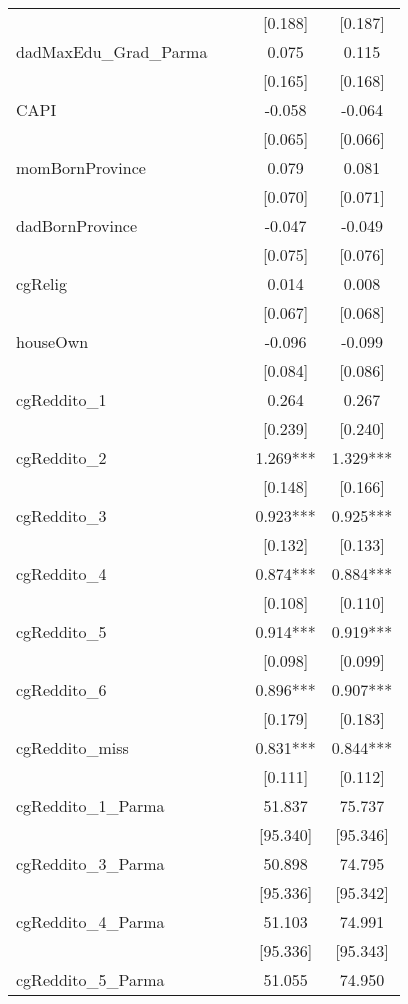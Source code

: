 \documentclass[]{article}
\begin{document}
\begin{tabular}{lcccc}
 &  &  & [0.188] & [0.187] \\
dadMaxEdu\_Grad\_Parma &  &  & 0.075 & 0.115 \\
 &  &  & [0.165] & [0.168] \\
CAPI &  &  & -0.058 & -0.064 \\
 &  &  & [0.065] & [0.066] \\
momBornProvince &  &  & 0.079 & 0.081 \\
 &  &  & [0.070] & [0.071] \\
dadBornProvince &  &  & -0.047 & -0.049 \\
 &  &  & [0.075] & [0.076] \\
cgRelig &  &  & 0.014 & 0.008 \\
 &  &  & [0.067] & [0.068] \\
houseOwn &  &  & -0.096 & -0.099 \\
 &  &  & [0.084] & [0.086] \\
cgReddito\_1 &  &  & 0.264 & 0.267 \\
 &  &  & [0.239] & [0.240] \\
cgReddito\_2 &  &  & 1.269*** & 1.329*** \\
 &  &  & [0.148] & [0.166] \\
cgReddito\_3 &  &  & 0.923*** & 0.925*** \\
 &  &  & [0.132] & [0.133] \\
cgReddito\_4 &  &  & 0.874*** & 0.884*** \\
 &  &  & [0.108] & [0.110] \\
cgReddito\_5 &  &  & 0.914*** & 0.919*** \\
 &  &  & [0.098] & [0.099] \\
cgReddito\_6 &  &  & 0.896*** & 0.907*** \\
 &  &  & [0.179] & [0.183] \\
cgReddito\_miss &  &  & 0.831*** & 0.844*** \\
 &  &  & [0.111] & [0.112] \\
cgReddito\_1\_Parma &  &  & 51.837 & 75.737 \\
 &  &  & [95.340] & [95.346] \\
cgReddito\_3\_Parma &  &  & 50.898 & 74.795 \\
 &  &  & [95.336] & [95.342] \\
cgReddito\_4\_Parma &  &  & 51.103 & 74.991 \\
 &  &  & [95.336] & [95.343] \\
cgReddito\_5\_Parma &  &  & 51.055 & 74.950 \\

\end{tabular}
\end{document}
